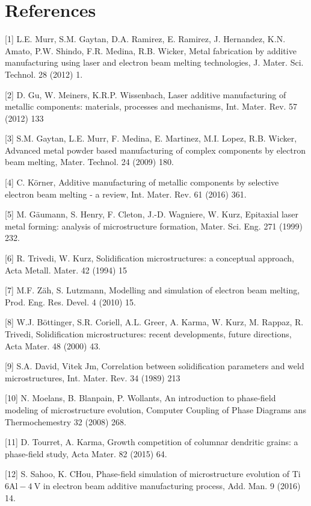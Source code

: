 \documentclass[10pt]{article}
\begin{document}
\section*{References}
[1] L.E. Murr, S.M. Gaytan, D.A. Ramirez, E. Ramirez, J. Hernandez, K.N. Amato, P.W. Shindo, F.R. Medina, R.B. Wicker, Metal fabrication by additive manufacturing using laser and electron beam melting technologies, J. Mater. Sci. Technol. 28 (2012) 1.

[2] D. Gu, W. Meiners, K.R.P. Wissenbach, Laser additive manufacturing of metallic components: materials, processes and mechanisms, Int. Mater. Rev. 57 (2012) 133

[3] S.M. Gaytan, L.E. Murr, F. Medina, E. Martinez, M.I. Lopez, R.B. Wicker, Advanced metal powder based manufacturing of complex components by electron beam melting, Mater. Technol. 24 (2009) 180.

[4] C. Körner, Additive manufacturing of metallic components by selective electron beam melting - a review, Int. Mater. Rev. 61 (2016) 361.

[5] M. Gäumann, S. Henry, F. Cleton, J.-D. Wagniere, W. Kurz, Epitaxial laser metal forming: analysis of microstructure formation, Mater. Sci. Eng. 271 (1999) 232.

[6] R. Trivedi, W. Kurz, Solidification microstructures: a conceptual approach, Acta Metall. Mater. 42 (1994) 15

[7] M.F. Zäh, S. Lutzmann, Modelling and simulation of electron beam melting, Prod. Eng. Res. Devel. 4 (2010) 15.

[8] W.J. Böttinger, S.R. Coriell, A.L. Greer, A. Karma, W. Kurz, M. Rappaz, R. Trivedi, Solidification microstructures: recent developments, future directions, Acta Mater. 48 (2000) 43.

[9] S.A. David, Vitek Jm, Correlation between solidification parameters and weld microstructures, Int. Mater. Rev. 34 (1989) 213

[10] N. Moelans, B. Blanpain, P. Wollants, An introduction to phase-field modeling of microstructure evolution, Computer Coupling of Phase Diagrams ans Thermochemestry 32 (2008) 268.

[11] D. Tourret, A. Karma, Growth competition of columnar dendritic grains: a phase-field study, Acta Mater. 82 (2015) 64.

[12] S. Sahoo, K. CHou, Phase-field simulation of microstructure evolution of Ti$6 \mathrm{Al}-4 \mathrm{~V}$ in electron beam additive manufacturing process, Add. Man. 9 (2016) 14.
\end{document}
